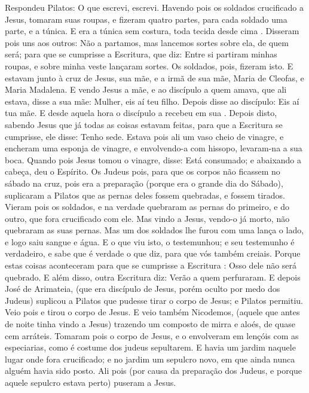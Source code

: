 {Respondeu Pilatos: O que escrevi, escrevi.
Havendo pois os soldados crucificado a Jesus, tomaram suas roupas, e fizeram quatro partes, para cada soldado uma parte, e a túnica. E era a túnica sem costura, toda tecida desde cima
{} .
Disseram pois uns aos outros: Não a partamos, mas lancemos sortes sobre ela, de quem será; para que se cumprisse a Escritura, que diz: Entre si partiram minhas roupas, e sobre minha veste lançaram sortes. Os soldados, pois, fizeram isto.
E estavam junto à cruz de Jesus, sua mãe, e a irmã de sua mãe, Maria
{} de Cleofas, e Maria Madalena.
E vendo Jesus a
{} mãe, e ao discípulo a quem amava, que ali estava, disse a sua mãe: Mulher, eis aí teu filho.
Depois disse ao discípulo: Eis aí tua mãe. E desde aquela hora o discípulo a recebeu em sua
{} .
Depois disto, sabendo Jesus que já todas as coisas estavam feitas, para que a Escritura se cumprisse, ele disse: Tenho sede.
Estava pois ali um vaso cheio de vinagre, e encheram uma esponja de vinagre, e envolvendo-a com hissopo, levaram-na a sua boca.
Quando pois Jesus tomou o vinagre, disse: Está consumado; e abaixando a cabeça, deu o Espírito.
Os Judeus pois, para que os corpos não ficassem no sábado na cruz, pois era a preparação (porque era o grande dia do Sábado), suplicaram a Pilatos que as pernas deles fossem quebradas, e fossem tirados.
Vieram pois os soldados, e na verdade quebraram as pernas do primeiro, e do outro, que fora crucificado com ele.
Mas vindo a Jesus,
{} vendo-o já morto, não quebraram as suas pernas.
Mas um dos soldados lhe furou com uma lança o lado, e logo saiu sangue e água.
E o que viu isto, o testemunhou; e seu testemunho é verdadeiro, e sabe que é verdade o que diz, para que vós também creiais.
Porque estas coisas aconteceram para que se cumprisse a Escritura
{} : Osso dele não será quebrado.
E além disso, outra Escritura diz: Verão
{} a quem perfuraram.
E depois José de Arimateia, (que era discípulo de Jesus, porém oculto por medo dos Judeus) suplicou a Pilatos que pudesse tirar o corpo de Jesus; e Pilatos permitiu. Veio pois e tirou o corpo de Jesus.
E veio também Nicodemos, (aquele que antes de noite tinha vindo a Jesus) trazendo um composto de mirra e aloés, de quase cem arráteis.
Tomaram pois o corpo de Jesus, e o envolveram em lençóis com as especiarias, como é costume dos judeus sepultarem.
E havia um jardim naquele lugar onde fora crucificado; e no jardim
{} um sepulcro novo, em que ainda nunca alguém havia sido posto.
Ali pois (por causa da preparação
{} dos Judeus, e porque aquele sepulcro estava perto) puseram a Jesus.

}
